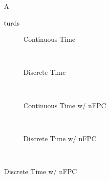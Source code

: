 \documentclass[12pt,letterpaper]{report}
\newlength\figureheight
\newlength\figurewidth
\begin{document}
\begin{figure}
A
\caption{turds}\label{fig:samplepath_paths}
\end{figure}



\clearpage
\begin{figure}%
\centering%
\setlength{}%
\setlength{}%
\begin{subfigure}[b]{\linewidth}%
  \centering%
  \hspace{1.5cm}%
  \caption{Continuous Time}%
\end{subfigure}\\%
\vspace{1cm}%
\begin{subfigure}[b]{\linewidth}%
  \centering
  \hspace{1.5cm}%
  \caption{Discrete Time}%
\end{subfigure}\\%
\vspace{1cm}%
\begin{subfigure}[b]{\linewidth}%
  \centering%
  \hspace{1.5cm}%
  \caption{Continuous Time w/ nFPC}%
\end{subfigure}\\%
\vspace{1cm}%
\begin{subfigure}[b]{\linewidth}%
  \centering%
  \hspace{1.5cm}%
  \caption{Discrete Time w/ nFPC}%
\end{subfigure}\\%
\leavevmode{}\hspace{0pt plus 1filll}\null%


\end{figure}
\end{document}
